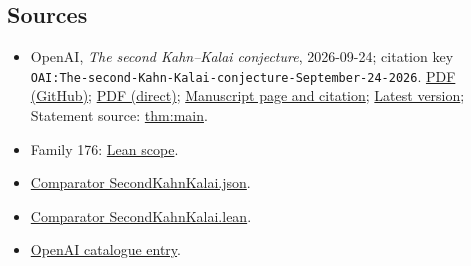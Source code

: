 \documentclass[11pt]{article}
\begin{document}
\subsection{Sources}
\begin{itemize}
\item OpenAI, \emph{The second Kahn–Kalai conjecture}, 2026-09-24; citation key \texttt{OAI:The-second-Kahn-Kalai-conjecture-September-24-2026}. \href{https://github.com/openai/math/blob/adc7f1241b42e322a6451854ab7e4b4c146bf78a/preprints/The-second-Kahn-Kalai-conjecture-September-24-2026/paper.pdf}{PDF (GitHub)}; \href{https://github.com/openai/math/raw/adc7f1241b42e322a6451854ab7e4b4c146bf78a/preprints/The-second-Kahn-Kalai-conjecture-September-24-2026/paper.pdf}{PDF (direct)}; \href{https://github.com/openai/math/blob/adc7f1241b42e322a6451854ab7e4b4c146bf78a/preprints/The-second-Kahn-Kalai-conjecture-September-24-2026/README.md}{Manuscript page and citation}; \href{https://github.com/openai/math/blob/main/preprints/The-second-Kahn-Kalai-conjecture-September-24-2026/paper.pdf}{Latest version}; Statement source: \href{https://github.com/openai/math/blob/adc7f1241b42e322a6451854ab7e4b4c146bf78a/preprints/The-second-Kahn-Kalai-conjecture-September-24-2026/build/source/sections/introduction.tex\#L32}{thm:main}.
\item Family 176: \href{https://github.com/openai/math/blob/adc7f1241b42e322a6451854ab7e4b4c146bf78a/lean/docs/176.md}{Lean scope}.
\item \href{https://github.com/openai/math/blob/adc7f1241b42e322a6451854ab7e4b4c146bf78a/lean/ComparatorChallenges/SecondKahnKalai.json}{Comparator SecondKahnKalai.json}.
\item \href{https://github.com/openai/math/blob/adc7f1241b42e322a6451854ab7e4b4c146bf78a/lean/ComparatorChallenges/SecondKahnKalai.lean}{Comparator SecondKahnKalai.lean}.
\item \href{https://github.com/openai/math/blob/adc7f1241b42e322a6451854ab7e4b4c146bf78a/CONTENTS.md}{OpenAI catalogue entry}.
\end{itemize}
\end{document}
